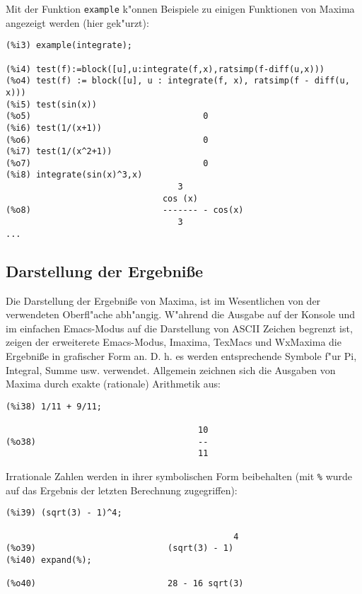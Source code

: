 \documentclass[spanish,12pt,a4paper]{article}
\begin{document}
Mit der Funktion \verb|example| k"onnen Beispiele zu einigen Funktionen von Maxima angezeigt werden (hier gek"urzt):
\scriptsize
\begin{verbatim}
(%i3) example(integrate);

(%i4) test(f):=block([u],u:integrate(f,x),ratsimp(f-diff(u,x)))
(%o4) test(f) := block([u], u : integrate(f, x), ratsimp(f - diff(u, x)))
(%i5) test(sin(x))
(%o5)                                  0
(%i6) test(1/(x+1))
(%o6)                                  0
(%i7) test(1/(x^2+1))
(%o7)                                  0
(%i8) integrate(sin(x)^3,x)
                                  3
                               cos (x)
(%o8)                          ------- - cos(x)
                                  3
...
\end{verbatim}
\normalsize

\subsection{Darstellung der Ergebni{\ss}e}


Die Darstellung der Ergebni{\ss}e von Maxima, ist im Wesentlichen von der verwendeten Oberfl"ache abh"angig. W"ahrend die Ausgabe auf der Konsole und im einfachen Emacs-Modus auf die Darstellung von ASCII Zeichen begrenzt ist, zeigen der erweiterete Emacs-Modus, Imaxima, TexMacs und WxMaxima die Ergebni{\ss}e in grafischer Form an. D. h. es werden entsprechende Symbole f"ur Pi, Integral, Summe usw. verwendet.
Allgemein zeichnen sich die Ausgaben von Maxima durch exakte (rationale) Arithmetik aus:

\scriptsize
\begin{verbatim}
(%i38) 1/11 + 9/11;

                                      10
(%o38)                                --
                                      11
\end{verbatim}
\normalsize


Irrationale Zahlen werden in ihrer symbolischen Form beibehalten (mit \verb|%| wurde auf das Ergebnis der letzten Berechnung zugegriffen):

\scriptsize
\begin{verbatim}
(%i39) (sqrt(3) - 1)^4;

                                             4
(%o39)                          (sqrt(3) - 1)
(%i40) expand(%);

(%o40)                          28 - 16 sqrt(3)
\end{verbatim}
\normalsize
\end{document}
